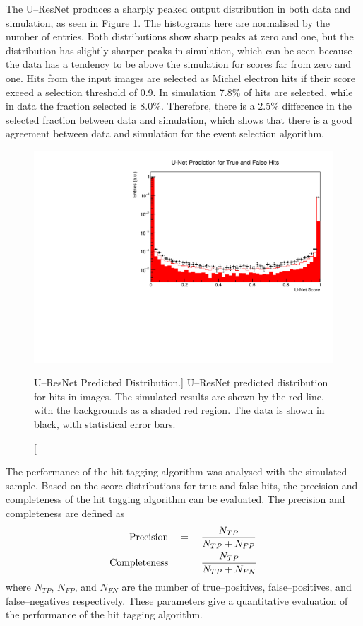 The U--ResNet produces a sharply peaked output distribution in both data and
simulation, as seen in Figure \ref{fig:unet_pred_data}. The histograms here are
normalised by the number of entries. Both distributions show sharp peaks at zero
and one, but the distribution has slightly sharper peaks in simulation, which 
can be seen because the data has a tendency to be above the simulation for
scores far from zero and one. Hits from the input images are selected as 
Michel electron hits if their score exceed a selection threshold of 0.9. In 
simulation 7.8\% of hits are selected, while in data the fraction selected is 
8.0\%. Therefore, there is a 2.5\% difference in the selected fraction between 
data and simulation, which shows that there is a good agreement between data and
simulation for the event selection algorithm.
\begin{figure}
	\centering
	\includegraphics[width=\textwidth]{figures/unet_pred_data.pdf}
	\caption
	[U--ResNet Predicted Distribution.]
	{U--ResNet predicted distribution for hits in images. The simulated results are
	shown by the red line, with the backgrounds as a shaded red region. The data 
	is shown in black, with statistical error bars.}
	\label{fig:unet_pred_data}
\end{figure}

The performance of the hit tagging algorithm was analysed with the simulated
sample. Based on the score distributions for true and false hits, the precision 
and completeness of the hit tagging algorithm can be evaluated. The precision 
and completeness are defined as 
\begin{align}
	\mbox{Precision} \quad &= \quad  \frac{N_{TP}}{N_{TP} + N_{FP}} \\
	\vspace{2mm}
	\mbox{Completeness} \quad &= \quad \frac{N_{TP}}{N_{TP} + N_{FN}}
\end{align}
where $N_{TP}$, $N_{FP}$, and $N_{FN}$ are the number of true--positives,
false--positives, and false--negatives respectively. These parameters give a
quantitative evaluation of the performance of the hit tagging algorithm.


